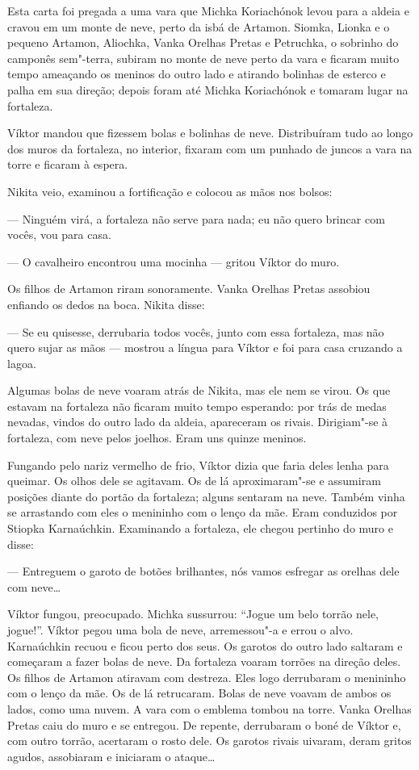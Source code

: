 Esta carta foi pregada a uma vara que Michka Koriachónok levou para a
aldeia e cravou em um monte de neve, perto da isbá de Artamon. Siomka,
Lionka e o pequeno Artamon, Aliochka, Vanka Orelhas Pretas e Petruchka,
o sobrinho do camponês sem"-terra, subiram no monte de neve perto da vara
e ficaram muito tempo ameaçando os meninos do outro lado e atirando
bolinhas de esterco e palha em sua direção; depois foram até Michka
Koriachónok e tomaram lugar na fortaleza.

Víktor mandou que fizessem bolas e bolinhas de neve. Distribuíram tudo
ao longo dos muros da fortaleza, no interior, fixaram com um punhado de
juncos a vara na torre e ficaram à espera.

Nikita veio, examinou a fortificação e colocou as mãos nos bolsos:

--- Ninguém virá, a fortaleza não serve para nada; eu não quero brincar
com vocês, vou para casa.

--- O cavalheiro encontrou uma mocinha --- gritou Víktor do muro.

Os filhos de Artamon riram sonoramente. Vanka Orelhas Pretas assobiou
enfiando os dedos na boca. Nikita disse:

--- Se eu quisesse, derrubaria todos vocês, junto com essa fortaleza,
mas não quero sujar as mãos --- mostrou a língua para Víktor e foi para
casa cruzando a lagoa.

Algumas bolas de neve voaram atrás de Nikita, mas ele nem se virou. Os
que estavam na fortaleza não ficaram muito tempo esperando: por trás de
medas nevadas, vindos do outro lado da aldeia, apareceram os rivais.
Dirigiam"-se à fortaleza, com neve pelos joelhos. Eram uns quinze
meninos.

Fungando pelo nariz vermelho de frio, Víktor dizia que faria deles lenha
para queimar. Os olhos dele se agitavam. Os de lá aproximaram"-se e
assumiram posições diante do portão da fortaleza; alguns sentaram na
neve. Também vinha se arrastando com eles o menininho com o lenço da
mãe. Eram conduzidos por Stiopka Karnaúchkin. Examinando a
fortaleza, ele chegou pertinho do muro e disse:

--- Entreguem o garoto de botões brilhantes, nós vamos esfregar as
orelhas dele com neve\ldots{}

Víktor fungou, preocupado. Michka sussurrou: ``Jogue um belo torrão
nele, jogue!''. Víktor pegou uma bola de neve, arremessou"-a e errou o
alvo. Karnaúchkin recuou e ficou perto dos seus. Os garotos do outro
lado saltaram e começaram a fazer bolas de neve. Da fortaleza voaram
torrões na direção deles. Os filhos de Artamon atiravam com destreza.
Eles logo derrubaram o menininho com o lenço da mãe. Os de lá
retrucaram. Bolas de neve voavam de ambos os lados, como uma nuvem. A
vara com o emblema tombou na torre. Vanka Orelhas Pretas caiu do muro e
se entregou. De repente, derrubaram o boné de Víktor e, com outro
torrão, acertaram o rosto dele. Os garotos rivais uivaram, deram
gritos agudos, assobiaram e iniciaram o ataque\ldots{}

